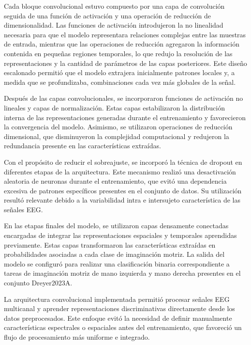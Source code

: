 Cada bloque convolucional estuvo compuesto por una capa de convolución seguida de una función de activación y una operación de reducción de dimensionalidad. Las funciones de activación introdujeron la no linealidad necesaria para que el modelo representara relaciones complejas entre las muestras de entrada, mientras que las operaciones de reducción agregaron la información contenida en pequeñas regiones temporales, lo que redujo la resolución de las representaciones y la cantidad de parámetros de las capas posteriores. Este diseño escalonado permitió que el modelo extrajera inicialmente patrones locales y, a medida que se profundizaba, combinaciones cada vez más globales de la señal.

Después de las capas convolucionales, se incorporaron funciones de activación no lineales y capas de normalización. Estas capas estabilizaron la distribución interna de las representaciones generadas durante el entrenamiento y favorecieron la convergencia del modelo. Asimismo, se utilizaron operaciones de reducción dimensional, que disminuyeron la complejidad computacional y redujeron la redundancia presente en las características extraídas.

Con el propósito de reducir el sobreajuste, se incorporó la técnica de dropout \cite{srivastava2014dropout} en diferentes etapas de la arquitectura. Este mecanismo realizó una desactivación aleatoria de neuronas durante el entrenamiento, que evitó una dependencia excesiva de patrones específicos presentes en el conjunto de datos. Su utilización resultó relevante debido a la variabilidad intra e intersujeto característica de las señales EEG.

En las etapas finales del modelo, se utilizaron capas densamente conectadas encargadas de integrar las representaciones espaciales y temporales aprendidas previamente. Estas capas transformaron las características extraídas en probabilidades asociadas a cada clase de imaginación motriz. La salida del modelo se configuró para realizar una clasificación binaria correspondiente a tareas de imaginación motriz de mano izquierda y mano derecha presentes en el conjunto Dreyer2023A.

La arquitectura convolucional implementada permitió procesar señales EEG multicanal y aprender representaciones discriminativas directamente desde los datos preprocesados. Este enfoque evitó la necesidad de definir manualmente características espectrales o espaciales antes del entrenamiento, que favoreció un flujo de procesamiento más uniforme e integrado.

